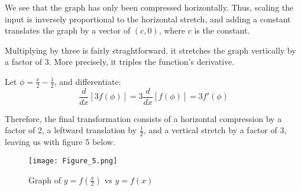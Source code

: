 \documentclass{article}
\begin{document}
We see that the graph has only been compressed horizontally. Thus, scaling the input is inversely proportional to the horizontal stretch, and adding a constant translates the graph by a vector of $(c,0)$, where $c$ is the constant.

\vspace{3mm} Multiplying by three is fairly straghtforward. it stretches the graph vertically by a factor of 3. More precisely, it triples the function’s derivative.

\begin{center}
    Let $\phi = \frac{x}{2} - \frac{1}{2}$, and differentiate:
    \[
    \frac{d}{dx}\left[3f(\phi)\right] = 3 \frac{d}{dx}\left[f(\phi)\right] = 3 f'(\phi)
    \]
\end{center}

Therefore, the final transformation consists of a horizontal compression by a factor of 2, a leftward translation by $\frac{1}{2}$, and a vertical stretch by a factor of 3, leaving us with figure 5 below.

\begin{figure}[H]
    \texttt{[image: Figure\_5.png]}
    \caption{Graph of $y = f\left(\frac{x}{2}\right)$ vs $y = f(x)$}
    \label{fig:Figure_5}
\end{figure}
\end{document}
